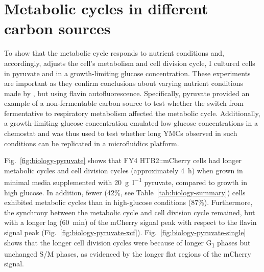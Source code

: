 \section{Metabolic cycles in different carbon sources}
\label{sec:biology-carbon}

To show that the metabolic cycle responds to nutrient conditions and, accordingly, adjusts the cell's metabolism and cell division cycle, I cultured cells in pyruvate and in a growth-limiting glucose concentration.
These experiments are important as they confirm conclusions about varying nutrient conditions made by \textcite{papagiannakisAutonomousMetabolicOscillations2017},
but using flavin autofluorescence.
Specifically, pyruvate provided an example of a non-fermentable carbon source to test whether the switch from fermentative to respiratory metabolism affected the metabolic cycle.
Additionally, a growth-limiting glucose concentration emulated low-glucose concentrations in a chemostat and was thus used to test whether long YMCs observed in such conditions can be replicated in a microfluidics platform.

Fig.\ \ref{fig:biology-pyruvate} shows that FY4 HTB2::mCherry cells had longer metabolic cycles and cell division cycles (approximately \SI{4}{\hour}) when grown in minimal media supplemented with \SI{20}{\gram~\litre^{-1}} pyruvate, compared to growth in high glucose.
In addition, fewer (42\%, see Table~\ref{tab:biology-summary}) cells exhibited metabolic cycles than in high-glucose conditions (87\%).
Furthermore, the synchrony between the metabolic cycle and cell division cycle remained, but with a longer lag (\SI{60}{\minute}) of the mCherry signal peak with respect to the flavin signal peak (Fig.\ \ref{fig:biology-pyruvate-xcf}).
Fig.\ \ref{fig:biology-pyruvate-single} shows that the longer cell division cycles were because of longer G\textsubscript{1} phases but unchanged S/M phases, as evidenced by the longer flat regions of the mCherry signal.

